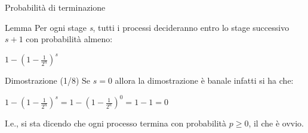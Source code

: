 \documentclass{beamer}
\begin{document}

\begin{frame}{Probabilità di terminazione}
    \begin{block}{Lemma}
        Per ogni stage \textit{s}, tutti i processi decideranno entro lo stage successivo $s+1$ con probabilità almeno:
        \begin{center}
        \huge
            $1 - (1-\frac{1}{2^n})^s$
        \end{center}
    \end{block}
\end{frame}

\begin{frame}{Dimostrazione (1/8)}
    Se $s = 0$ allora la dimostrazione è banale infatti si ha che:
    \vspace{0.3cm}
    \begin{center}
        \Large
        $1 - (1 - \frac{1}{2^n})^s = 1 - (1 - \frac{1}{2^n})^0 = 1 - 1 = 0$
    \end{center}
    \normalsize
    \vspace{0.3cm}
    I.e., si sta dicendo che ogni processo termina con probabilità $p \geq 0$, il che è ovvio.
\end{frame}
\end{document}
